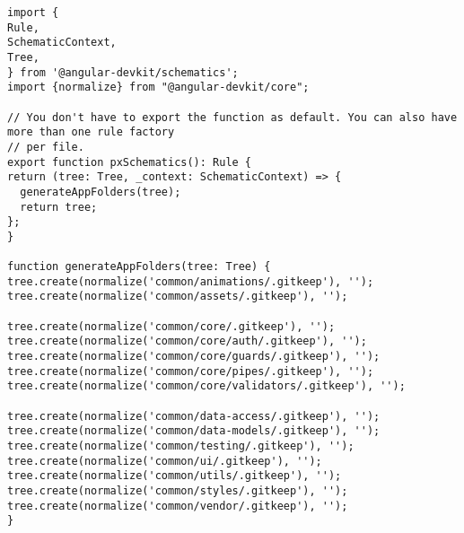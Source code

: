 \begin{lstlisting}
import {
Rule,
SchematicContext,
Tree,
} from '@angular-devkit/schematics';
import {normalize} from "@angular-devkit/core";

// You don't have to export the function as default. You can also have more than one rule factory
// per file.
export function pxSchematics(): Rule {
return (tree: Tree, _context: SchematicContext) => {
  generateAppFolders(tree);
  return tree;
};
}

function generateAppFolders(tree: Tree) {
tree.create(normalize('common/animations/.gitkeep'), '');
tree.create(normalize('common/assets/.gitkeep'), '');

tree.create(normalize('common/core/.gitkeep'), '');
tree.create(normalize('common/core/auth/.gitkeep'), '');
tree.create(normalize('common/core/guards/.gitkeep'), '');
tree.create(normalize('common/core/pipes/.gitkeep'), '');
tree.create(normalize('common/core/validators/.gitkeep'), '');

tree.create(normalize('common/data-access/.gitkeep'), '');
tree.create(normalize('common/data-models/.gitkeep'), '');
tree.create(normalize('common/testing/.gitkeep'), '');
tree.create(normalize('common/ui/.gitkeep'), '');
tree.create(normalize('common/utils/.gitkeep'), '');
tree.create(normalize('common/styles/.gitkeep'), '');
tree.create(normalize('common/vendor/.gitkeep'), '');
}
\end{lstlisting}

